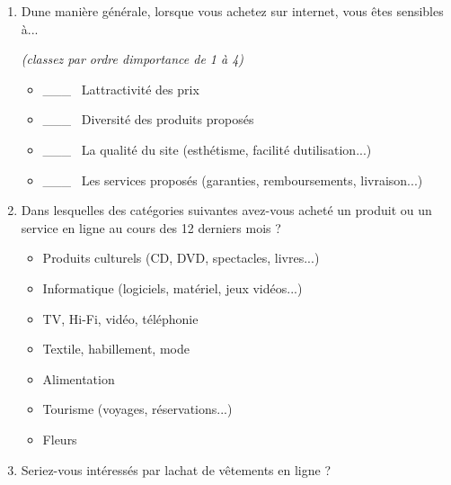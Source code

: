 \documentclass[12pt,twoside]{article}
\begin{document}
\begin{enumerate}
			\bigskip
			
	\item D{\textquotesingle}une mani\`ere g\'en\'erale, lorsque vous achetez sur internet, vous \^etes sensibles \`a...	
			
		{\itshape
			(classez par ordre d{\textquotesingle}importance de 1 \`a 4)}
			
			\bigskip
			
			\begin{itemize}
			\item[] \_\_\_ \  L{\textquotesingle}attractivit\'e des prix
			
			\item[] \_\_\_ \  Diversit\'e des produits propos\'es
			
			\item[] \_\_\_ \  La qualit\'e du site (esth\'etisme, facilit\'e d{\textquotesingle}utilisation...)
			
			\item[] \_\_\_ \  Les services propos\'es (garanties, remboursements, livraison...)
			\end{itemize}

			\bigskip
			
	\item Dans lesquelles des cat\'egories suivantes avez{}-vous achet\'e un
			produit ou un service en ligne au cours des 12 derniers mois ?
			
			\bigskip
			
			\begin{itemize}
				\item[\square] Produits culturels (CD, DVD, spectacles, livres...)
				\item[\square] Informatique (logiciels, mat\'eriel, jeux vid\'eos...)
				\item[\square] TV, Hi{}-Fi, vid\'eo, t\'el\'ephonie
				\item[\square] Textile, habillement, mode
				\item[\square] Alimentation
				\item[\square] Tourisme (voyages, r\'eservations...) 
				\item[\square] Fleurs
			\end{itemize}

			\bigskip
			
	\item Seriez{}-vous int\'eress\'es par l{\textquotesingle}achat de v\^etements en ligne ?
	
			\bigskip
	

\end{enumerate}
\end{document}
